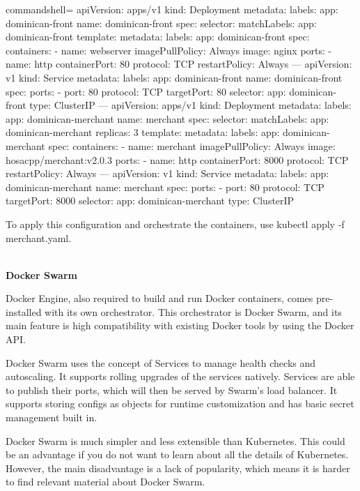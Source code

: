 \begin{tcblisting}{commandshell={}}
apiVersion: apps/v1
kind: Deployment
metadata:
  labels:
    app: dominican-front
  name: dominican-front
spec:
  selector:
    matchLabels:
      app: dominican-front
  template:
    metadata:
      labels:
        app: dominican-front
    spec:
      containers:
        - name: webserver
          imagePullPolicy: Always
          image: nginx
          ports:
            - name: http
              containerPort: 80
              protocol: TCP
      restartPolicy: Always
---
apiVersion: v1
kind: Service
metadata:
  labels:
    app: dominican-front
  name: dominican-front
spec:
  ports:
    - port: 80
      protocol: TCP
      targetPort: 80
  selector:
    app: dominican-front
  type: ClusterIP
---
apiVersion: apps/v1
kind: Deployment
metadata:
  labels:
    app: dominican-merchant
  name: merchant
spec:
  selector:
    matchLabels:
      app: dominican-merchant
  replicas: 3
  template:
    metadata:
      labels:
        app: dominican-merchant
  spec:
    containers:
      - name: merchant
        imagePullPolicy: Always
        image: hosacpp/merchant:v2.0.3
        ports:
          - name: http
            containerPort: 8000
            protocol: TCP
    restartPolicy: Always
---
apiVersion: v1
kind: Service
metadata:
  labels:
    app: dominican-merchant
  name: merchant
spec:
  ports:
    - port: 80
      protocol: TCP
      targetPort: 8000
  selector:
    app: dominican-merchant
    type: ClusterIP
\end{tcblisting}

To apply this configuration and orchestrate the containers, use kubectl apply -f merchant.yaml.

\hspace*{\fill} \\ %
\noindent
\textbf{Docker Swarm}

Docker Engine, also required to build and run Docker containers, comes pre-installed with its own orchestrator. This orchestrator is Docker Swarm, and its main feature is high compatibility with existing Docker tools by using the Docker API.

Docker Swarm uses the concept of Services to manage health checks and autoscaling. It supports rolling upgrades of the services natively. Services are able to publish their ports, which will then be served by Swarm's load balancer. It supports storing configs as objects for runtime customization and has basic secret management built in.

Docker Swarm is much simpler and less extensible than Kubernetes. This could be an advantage if you do not want to learn about all the details of Kubernetes. However, the main disadvantage is a lack of popularity, which means it is harder to find relevant material about Docker Swarm.

